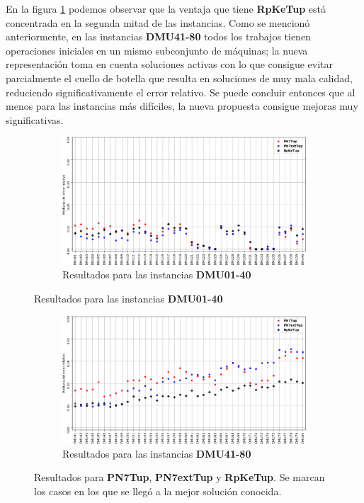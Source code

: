 En la figura \ref{fig:n7vsn8vsprerr} podemos observar que la ventaja que tiene \textbf{RpKeTup} está concentrada en la segunda mitad de las instancias. 
%
Como se mencionó anteriormente, en las instancias \textbf{DMU41-80} todos los trabajos tienen operaciones iniciales en un mismo subconjunto de máquinas; 
%
la nueva representación toma en cuenta soluciones activas con lo que consigue evitar parcialmente el cuello de botella que resulta en soluciones de muy mala calidad,
reduciendo significativamente el error relativo.
%
Se puede concluir entonces que al menos para las instancias más difíciles, la nueva propuesta consigue mejoras muy significativas.
\begin{figure}[hbtp]
    \begin{subfigure}{\textwidth}
        \centering
        \includegraphics[scale=.6]{Imagenes/prvsn7vsn8err1.png}
        \caption{Resultados para las instancias \textbf{DMU01-40}}
    \end{subfigure}
\end{figure}
\begin{figure}[H]\ContinuedFloat
    \begin{subfigure}{\textwidth}
        \centering
        \includegraphics[scale=.6]{Imagenes/prvsn7vsn8err2.png}
        \caption{Resultados para las instancias \textbf{DMU41-80}}
    \end{subfigure}
    \caption{Resultados para \textbf{PN7Tup}, \textbf{PN7extTup} y \textbf{RpKeTup}. Se marcan los casos en los que se llegó a la mejor solución conocida.}
    \label{fig:n7vsn8vsprerr}
\end{figure}

